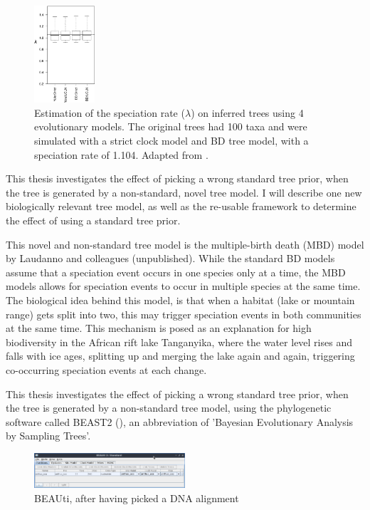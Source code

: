 \begin{figure}[H]
  \includegraphics[width=0.2\textwidth]{sarver2019choice_top_4_bars.png}
  \caption{
    Estimation of the speciation rate ($\lambda$)
    on inferred trees using 4 evolutionary models.
    The original trees had 100 taxa and were simulated with a strict clock model 
    and BD tree model, with a speciation rate of 1.104.
    Adapted from \cite{sarver2019choice}.
 }
  \label{fig:sarver2019choice}
\end{figure}

This thesis investigates the effect of picking a wrong standard
tree prior, when the tree is generated by a non-standard, novel tree model.
I will describe one new biologically relevant tree model, as well as the re-usable framework to determine the effect of using a standard tree prior. 

This novel and non-standard tree model is the multiple-birth 
death (MBD) model by Laudanno and colleagues (unpublished).
While the standard BD models assume that a speciation event occurs in one
species only at a time, the MBD models allows for speciation events
to occur in multiple species at the same time.
The biological idea behind this model, is that when a 
habitat (lake or mountain range) gets split into two, 
this may trigger speciation events in both communities at the same time. 
This mechanism is posed as an
explanation for high biodiversity in the African rift lake Tanganyika,
where the water level rises and falls with ice ages,
splitting up and merging the lake again and again, 
triggering co-occurring speciation events at each change. 

%
%
%

This thesis investigates the effect of picking a wrong standard
tree prior, when the tree is generated 
by a non-standard tree model, using the phylogenetic software 
called BEAST2 (\cite{beast2}),
an abbreviation of 'Bayesian Evolutionary Analysis by Sampling Trees'.

\begin{figure}[H]
  \includegraphics[width=0.5\textwidth]{beauti_alignment.png}
  \caption{
    BEAUti, after having picked a DNA alignment
  }
  \label{fig:beauti_alignment}
\end{figure}

